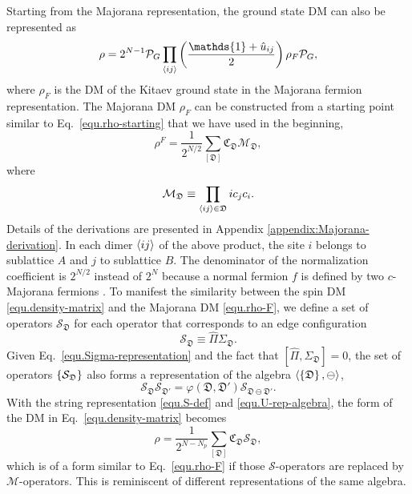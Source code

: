 Starting from the Majorana representation, the ground state DM can also be represented as
\[
  \rho = 2^{N-1}\mathcal{P}_G\prod_{\anglelr{ij}}\lr{\frac{\mathds{1}+\hat{u}_{ij}}{2}}\rho_F\mathcal{P}_G,
\]
where $\rho_F$ is the DM of the Kitaev ground state in the Majorana fermion representation. The Majorana DM $\rho_F$ can be constructed from a starting point similar to Eq.~\eqref{equ.rho-starting} that we have used in the beginning,
\begin{equation}\label{equ.rho-F}
    \rho^F = \frac{1}{2^{N/2}}\sum_{[\mathfrak{D}]}\mathfrak{C}_\mathfrak{D}\mathcal{M}_\mathfrak{D},
\end{equation}
where
\begin{equation}\label{equ.V-rep-def}
    \mathcal{M}_\mathfrak{D} \equiv \prod_{\left\langle ij \right\rangle\in\mathfrak{D}}ic_jc_i.
\end{equation}
Details of the derivations are presented in Appendix \ref{appendix:Majorana-derivation}. In each dimer $\left\langle ij \right\rangle$ of the above product, the site $i$ belongs to sublattice $A$ and $j$ to sublattice $B$. The denominator of the normalization coefficient is $2^{N/2}$ instead of $2^N$ because a normal fermion $f$ is defined by two $c$-Majorana fermions
%
. To manifest the similarity between the spin DM \eqref{equ.density-matrix} and the Majorana DM \eqref{equ.rho-F}, we define a set of operators $\mathcal{S}_{\mathfrak{D}}$ for each operator that corresponds to an edge configuration
\begin{equation}\label{equ.S-def}
    \mathcal{S}_\mathfrak{D} \equiv \hat{\Pi}\Sigma_\mathfrak{D}.
\end{equation}
Given Eq.~\eqref{equ.Sigma-representation} and the fact that $[{\hat{\Pi}},\Sigma_{\mathfrak{D}}]=0$, the set of operators $\left\{ \mathcal{S}_{\mathfrak{D}} \right\}$ also forms a representation of the algebra $\left\langle \left\{ \mathfrak{D} \right\},\ominus \right\rangle$, 
\begin{equation}\label{equ.U-rep-algebra}
    \mathcal{S}_{\mathfrak{D}}\mathcal{S}_{\mathfrak{D}'} = \varphi(\mathfrak{D},\mathfrak{D}')\mathcal{S}_{\mathfrak{D}\ominus\mathfrak{D}'}.
\end{equation}
With the string representation \eqref{equ.S-def} and \eqref{equ.U-rep-algebra}, the form of the DM in Eq.~\eqref{equ.density-matrix} becomes
\begin{equation}\label{equ.rho-U}
    \rho =  \frac{1}{2^{N-N_p}} \sum_{[\mathfrak{D}]}\mathfrak{C}_{\mathfrak{D}}\mathcal{S}_{\mathfrak{D}},
\end{equation}
which is of a form similar to Eq.~\eqref{equ.rho-F} if those $\mathcal{S}$-operators are replaced by $\mathcal{M}$-operators. This is reminiscent of different representations of the same algebra.
